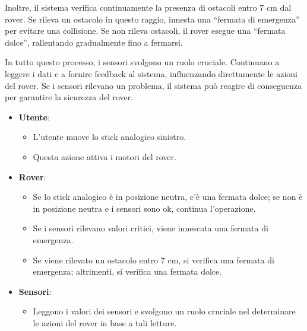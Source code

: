 \documentclass{article}
\begin{document}
        Inoltre, il sistema verifica continuamente la presenza di ostacoli entro 7 cm dal rover. Se rileva un ostacolo in questo raggio, innesta una “fermata di emergenza” per evitare una collisione. Se non rileva ostacoli, il rover esegue una “fermata dolce”, rallentando gradualmente fino a fermarsi.
        
        In tutto questo processo, i sensori svolgono un ruolo cruciale. Continuano a leggere i dati e a fornire feedback al sistema, influenzando direttamente le azioni del rover. Se i sensori rilevano un problema, il sistema può reagire di conseguenza per garantire la sicurezza del rover.

        \begin{itemize}
          \item \textbf{Utente}:
              \begin{itemize}
              \item L'utente muove lo stick analogico sinistro.
              \item Questa azione attiva i motori del rover.
              \end{itemize}
          \item \textbf{Rover}:
              \begin{itemize}
              \item Se lo stick analogico è in posizione neutra, c'è una fermata dolce; se non è in posizione neutra e i sensori sono ok, continua l'operazione.
              \item Se i sensori rilevano valori critici, viene innescata una fermata di emergenza.
              \item Se viene rilevato un ostacolo entro 7 cm, si verifica una fermata di emergenza; altrimenti, si verifica una fermata dolce.
              \end{itemize}
          \item \textbf{Sensori}:
              \begin{itemize}
              \item Leggono i valori dei sensori e svolgono un ruolo cruciale nel determinare le azioni del rover in base a tali letture.
              \end{itemize}
        \end{itemize}
          
\end{document}
